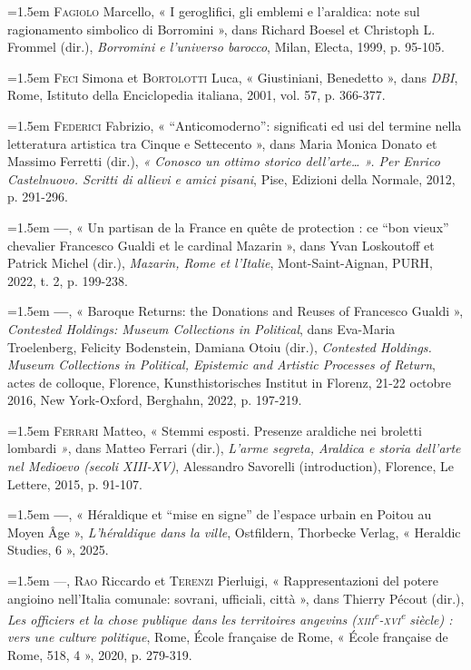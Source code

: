 \documentclass[12pt,twoside,openany]{book}
\newenvironment{PurhBibliography}
  {%
    \par
    \setlength{\parindent}{0pt}%
    \setlength{\leftskip}{0pt}%
  }
  {%
    \par
  }
\begin{document}
\begin{PurhBibliography}
\noindent\hangindent=1.5em \textsc{Fagiolo} Marcello, « I geroglifici, gli emblemi e l’araldica: note sul ragionamento simbolico di Borromini », dans Richard Boesel et Christoph L. Frommel (dir.), \textit{Borromini e l’universo barocco}, Milan, Electa, 1999, p. 95-105.\par
\noindent\hangindent=1.5em \textsc{Feci} Simona et \textsc{Bortolotti} Luca, « Giustiniani, Benedetto », dans \textit{DBI}, Rome, Istituto della Enciclopedia italiana, 2001, vol. 57, p. 366-377.\par
\noindent\hangindent=1.5em \textsc{Federici} Fabrizio, « “Anticomoderno”: significati ed usi del termine nella letteratura artistica tra Cinque e Settecento », dans Maria Monica Donato et Massimo Ferretti (dir.), \textit{« Conosco un ottimo storico dell’arte… ». Per Enrico Castelnuovo. Scritti di allievi e amici pisani}, Pise, Edizioni della Normale, 2012, p. 291-296.\par
\noindent\hangindent=1.5em \textbf{—}, « Un partisan de la France en quête de protection : ce “bon vieux” chevalier Francesco Gualdi et le cardinal Mazarin », dans Yvan Loskoutoff et Patrick Michel (dir.), \textit{Mazarin, Rome et l’Italie}, Mont-Saint-Aignan, PURH, 2022, t. 2, p. 199-238.\par
\noindent\hangindent=1.5em \textbf{—}, « Baroque Returns: the Donations and Reuses of Francesco Gualdi », \textit{Contested Holdings: Museum Collections in Political}, dans Eva-Maria Troelenberg, Felicity Bodenstein, Damiana Otoiu (dir.), \textit{Contested Holdings. Museum Collections in Political, Epistemic and Artistic Processes of Return}, actes de colloque, Florence, Kunsthistorisches Institut in Florenz, 21-22 octobre 2016, New York-Oxford, Berghahn, 2022, p. 197-219.\par
\noindent\hangindent=1.5em \textsc{Ferrari} Matteo, « Stemmi esposti. Presenze araldiche nei broletti lombardi \textit{»}, dans Matteo Ferrari (dir.), \textit{L’arme segreta, Araldica e storia dell’arte nel Medioevo (secoli XIII-XV)}, Alessandro Savorelli (introduction), Florence, Le Lettere, 2015, p. 91-107.\par
\noindent\hangindent=1.5em \textbf{—}, « Héraldique et “mise en signe” de l’espace urbain en Poitou au Moyen Âge », \textit{L’héraldique dans la ville}, Ostfildern, Thorbecke Verlag, « Heraldic Studies, 6 », 2025.\par
\noindent\hangindent=1.5em \textsc{—}, \textsc{Rao} Riccardo et \textsc{Terenzi} Pierluigi, « Rappresentazioni del potere angioino nell’Italia comunale: sovrani, ufficiali, città », dans Thierry Pécout (dir.), \textit{Les officiers et la chose publique dans les territoires angevins (}\textit{\textsc{xiii}}\textit{\textsuperscript{e}}\textit{-}\textit{\textsc{xvi}}\textit{\textsuperscript{e}}\textit{ siècle) : vers une culture politique}, Rome, École française de Rome, « École française de Rome, 518, 4 », 2020, p. 279-319.\par

\end{PurhBibliography}
\end{document}
